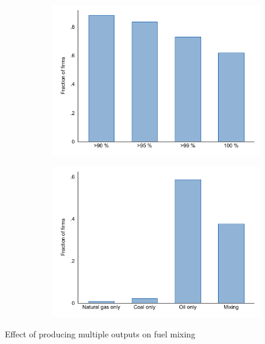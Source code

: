 \documentclass[12pt,notitlepage]{article}
\begin{document}
\begin{figure}[!htpb]
\centering
\caption{Quantity Shares (mmbtu)}
\begin{subfigure}{.49\textwidth}
    \centering
 \includegraphics[scale=0.8]{../Output/Graphs/FuelThreshold_FirmProp.pdf}
\end{subfigure}%
\begin{subfigure}{.49\textwidth}
    \centering
 \includegraphics[scale=0.8]{../Output/Graphs/Fueltype_Firmprop.pdf}
\end{subfigure}
\end{figure}

\begin{table}[!htpb]
	\centering
	\caption{Effect of producing multiple outputs on fuel mixing}
	
\end{table}
\end{document}
